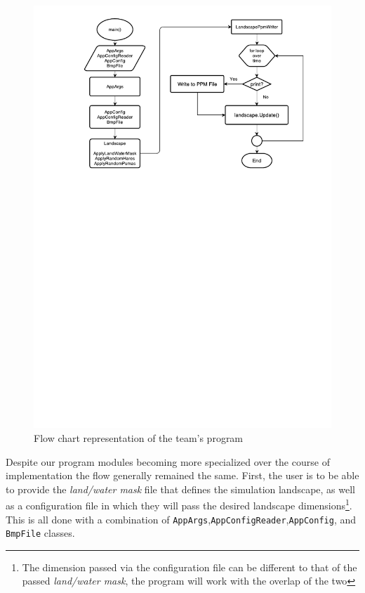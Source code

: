 \begin{figure}
   \begin{center}
      \includegraphics[width=\textwidth]{PS-Coursework-Flow.pdf}
   \end{center}
   \caption{Flow chart representation of the team's program }
   \label{fig:DesignFlowChart}
\end{figure}

Despite our program modules becoming more specialized over the course of implementation the flow generally remained the same. First, the user is to be able to provide the \textit{land/water mask} file that defines the simulation landscape, as well as a configuration file in which they will pass the desired landscape dimensions\footnote{The dimension passed via the configuration file can be different to that of the passed \textit{land/water mask}, the program will work with the overlap of the two}. This is all done with a combination of \texttt{AppArgs},\texttt{AppConfigReader},\texttt{AppConfig}, and \texttt{BmpFile} classes.  

